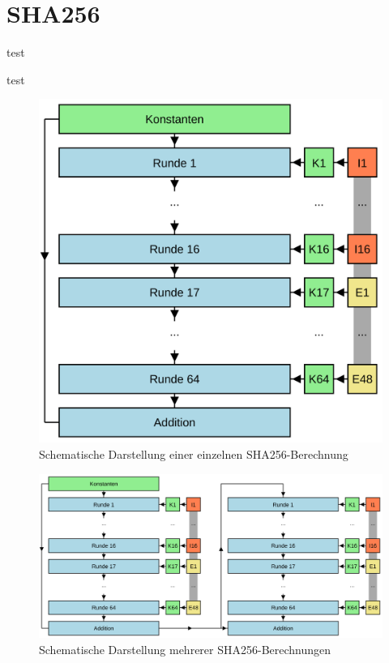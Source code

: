 \chapter{SHA256}
\label{chp:anpassungen}

test \cite{rfc6234}

test \cite{nist1804}

\begin{figure}[ht]
  \centering
  \includegraphics[scale=0.4]{images/sha256single}
  \caption{Schematische Darstellung einer einzelnen SHA256-Berechnung}
  \label{fig:sha256single}
\end{figure}

\begin{figure}[ht]
  \centering
  \includegraphics[scale=0.4]{images/sha256multi}
  \caption{Schematische Darstellung mehrerer SHA256-Berechnungen}
  \label{fig:sha256multi}
\end{figure}





